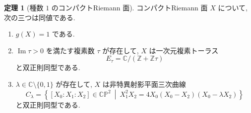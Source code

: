 \documentclass[dvipdfmx,a4paper,11pt]{article} %
\newcommand{\C}{\mathbb{C}}
\theoremstyle{definition}
\newtheorem{thm}{定理}[section]
\numberwithin{equation}{section}
\begin{document}
\begin{thm}[種数 $1$ のコンパクトRiemann 面]\label{O-M355}
コンパクトRiemann 面 $X$ について, 次の三つは同値である.
\begin{enumerate}
\item
$g(X)=1$ である.

\item
$\operatorname{Im}\tau>0$ を満たす複素数 $\tau$ が存在して, 
$X$ は一次元複素トーラス
\[
E_\tau=\mathbb C/(\mathbb Z+\mathbb Z\tau)
\]
と双正則同型である.

\item
$\lambda\in\mathbb C\setminus\{0,1\}$ が存在して, 
$X$ は非特異射影平面三次曲線
\[
C_\lambda
=
\left\{
[X_0:X_1:X_2]\in\C\mathbb P^2
\ \middle|\
X_1^2X_2=4X_0(X_0-X_2)(X_0-\lambda X_2)
\right\}
\]
と双正則同型である.
\end{enumerate}
\end{thm}
\end{document}
